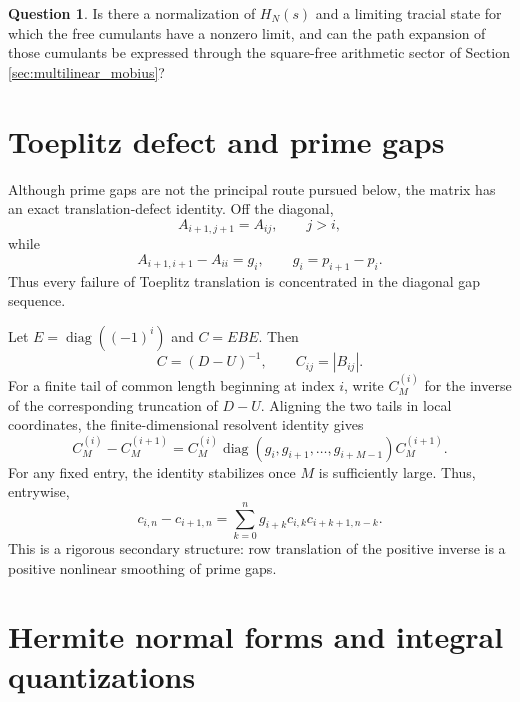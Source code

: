 \documentclass[11pt]{amsart}
\numberwithin{equation}{section}
\theoremstyle{plain}
\theoremstyle{definition}
\newtheorem{question}[theorem]{Question}
\theoremstyle{remark}
\newcommand{\diag}{\operatorname{diag}}
\begin{document}
\begin{question}
\label{question:double_mobius_interaction}
Is there a normalization of $H_N(s)$ and a limiting tracial state for which the free cumulants have a nonzero limit, and can the path expansion of those cumulants be expressed through the square-free arithmetic sector of Section \ref{sec:multilinear_mobius}?
\end{question}

\section{Toeplitz defect and prime gaps}
\label{sec:toeplitz_defect}

Although prime gaps are not the principal route pursued below, the matrix has an exact translation-defect identity.  Off the diagonal,
\begin{equation}
A_{i+1,j+1}=A_{ij},
\qquad j>i,
\label{eq:offdiag_toeplitz}
\end{equation}
while
\begin{equation}
A_{i+1,i+1}-A_{ii}=g_i,
\qquad g_i=p_{i+1}-p_i.
\label{eq:diagonal_gap_defect}
\end{equation}
Thus every failure of Toeplitz translation is concentrated in the diagonal gap sequence.

Let $E=\diag((-1)^i)$ and $C=EBE$.  Then
\begin{equation}
C=(D-U)^{-1},
\qquad C_{ij}=|B_{ij}|.
\label{eq:positive_inverse}
\end{equation}
For a finite tail of common length beginning at index $i$, write $C_M^{(i)}$ for the inverse of the corresponding truncation of $D-U$.  Aligning the two tails in local coordinates, the finite-dimensional resolvent identity gives
\begin{equation}
C_M^{(i)}-C_M^{(i+1)}
=C_M^{(i)}\diag(g_i,g_{i+1},\ldots,g_{i+M-1})C_M^{(i+1)}.
\label{eq:gap_resolvent_identity}
\end{equation}
For any fixed entry, the identity stabilizes once $M$ is sufficiently large.  Thus, entrywise,
\begin{equation}
c_{i,n}-c_{i+1,n}
=
\sum_{k=0}^n g_{i+k}c_{i,k}c_{i+k+1,n-k}.
\label{eq:gap_convolution_identity}
\end{equation}
This is a rigorous secondary structure: row translation of the positive inverse is a positive nonlinear smoothing of prime gaps.

\section{Hermite normal forms and integral quantizations}
\label{sec:hermite}
\end{document}
